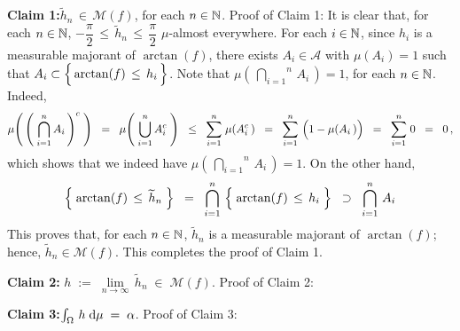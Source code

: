 \vskip 0.8cm
\noindent
\textbf{Claim 1:}\quad $\widetilde{h}_{n} \,\in\, \mathcal{M}(f)$, for each $n \in \mathbb{N}$.
\vskip 0.1cm
\noindent
Proof of Claim 1:\;\;
It is clear that, for each $n \in \mathbb{N}$, $-\dfrac{\pi}{2} \,\leq\, \widetilde{h}_{n} \,\leq\, \dfrac{\pi}{2}$ $\mu$-almost everywhere.
For each $i \in \mathbb{N}$, since $h_{i}$ is a measurable majorant of $\arctan(f)$,
there exists $A_{i} \in \mathcal{A}$ with $\mu(A_{i}) = 1$
such that $A_{i} \subset \left\{\, \arctan(f) \,\overset{{\color{white}.}}{\leq}\, h_{i} \,\right\}$.
Note that $\mu\!\left(\,\overset{n}{\underset{i=1}{\bigcap}}\,A_{i}\,\right) = 1$, for each $n \in \mathbb{N}$.
Indeed,
\begin{equation*}
\mu\!\left(\,\left(\;\overset{n}{\underset{i=1}{\bigcap}}\,A_{i}\,\right)^{c}\;\right)
\;\; = \;\;
	\mu\!\left(\;\overset{n}{\underset{i=1}{\bigcup}}\,A_{i}^{c}\;\right)
\;\; \leq \;\;
	\overset{n}{\underset{i=1}{\sum}}\;\mu\!\left(A_{i}^{c}\,\right)
\;\; = \;\;
	\overset{n}{\underset{i=1}{\sum}}\,\left(1 \overset{{\color{white}.}}{-} \mu\!\left(A_{i}\,\right)\right)
\;\; = \;\;
	\overset{n}{\underset{i=1}{\sum}}\;0
\;\; = \;\;
	0\,,
\end{equation*}
which shows that we indeed have $\mu\!\left(\,\overset{n}{\underset{i=1}{\bigcap}}\,A_{i}\,\right) = 1$.
On the other hand,
\begin{equation*}
\left\{\;\arctan(f) \,\leq\, \widetilde{h}_{n}\;\right\}
\;\; = \;\;
	\bigcap_{i=1}^{n}\,\left\{\;\arctan(f) \,\overset{{\color{white}.}}{\leq}\, h_{i}\;\right\}
\;\; \supset \;\;
	\bigcap_{i=1}^{n}\,A_{i}
\end{equation*}
This proves that, for each $n \in \mathbb{N}$, $\widetilde{h}_{n}$ is a measurable majorant of $\arctan(f)$;
hence, $\widetilde{h}_{n} \in \mathcal{M}(f)$. This completes the proof of Claim 1.

\vskip 0.8cm
\noindent
\textbf{Claim 2:}\quad
$h \; := \; \underset{n\rightarrow\infty}{\lim}\,\widetilde{h}_{n} \; \in \; \mathcal{M}(f)$.
\vskip 0.1cm
\noindent
Proof of Claim 2:

\vskip 0.8cm
\noindent
\textbf{Claim 3:}\quad $\int_{\Omega}\, h \; \textnormal{d}\mu \; = \; \alpha$.
\vskip 0.1cm
\noindent
Proof of Claim 3:

